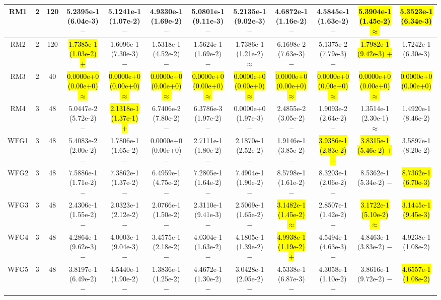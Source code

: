 \documentclass[journal]{IEEEtran}
\begin{document}
\begin{table*}[htbp]
\begin{tabular}{cccccccccccc}
\hline
\multirow{1}{*}{RM1}&2&120&5.2395e-1 (6.04e-3) $-$&5.1241e-1 (1.07e-2) $-$&4.9330e-1 (1.69e-2) $-$&5.0801e-1 (9.11e-3) $-$&5.2135e-1 (9.02e-3) $-$&4.6872e-1 (1.16e-2) $-$&4.5845e-1 (1.63e-2) $-$&\hl{5.3904e-1 (1.45e-2) $\approx$}&\hl{5.3523e-1 (6.34e-3)}\\
\hline
\multirow{1}{*}{RM2}&2&120&\hl{1.7385e-1 (1.03e-2) $+$}&1.6096e-1 (7.30e-3) $-$&1.5318e-1 (4.52e-2) $-$&1.5624e-1 (1.69e-2) $-$&1.7386e-1 (1.21e-2) $\approx$&6.1698e-2 (7.63e-3) $-$&5.1375e-2 (7.79e-3) $-$&\hl{1.7982e-1 (9.42e-3) $+$}&1.7242e-1 (6.30e-3)\\
\hline
\multirow{1}{*}{RM3}&2&40&\hl{0.0000e+0 (0.00e+0) $\approx$}&\hl{0.0000e+0 (0.00e+0) $\approx$}&\hl{0.0000e+0 (0.00e+0) $\approx$}&\hl{0.0000e+0 (0.00e+0) $\approx$}&\hl{0.0000e+0 (0.00e+0) $\approx$}&\hl{0.0000e+0 (0.00e+0) $\approx$}&\hl{0.0000e+0 (0.00e+0) $\approx$}&\hl{0.0000e+0 (0.00e+0) $\approx$}&\hl{0.0000e+0 (0.00e+0)}\\
\hline
\multirow{1}{*}{RM4}&3&48&5.0447e-2 (5.72e-2) $-$&\hl{2.1318e-1 (1.37e-1) $+$}&6.7406e-2 (7.80e-2) $-$&6.3786e-3 (1.97e-2) $-$&0.0000e+0 (1.97e-3) $-$&2.4855e-2 (3.05e-2) $-$&1.9093e-2 (2.64e-2) $-$&1.3514e-1 (2.30e-1) $\approx$&1.4920e-1 (8.46e-2)\\
\hline
\multirow{1}{*}{WFG1}&3&48&5.4083e-2 (2.00e-2) $-$&1.7806e-1 (1.65e-2) $-$&0.0000e+0 (0.00e+0) $-$&2.7111e-1 (1.80e-2) $-$&2.1870e-1 (2.52e-2) $-$&1.9146e-1 (3.85e-2) $-$&\hl{3.9386e-1 (2.83e-2) $+$}&\hl{3.8315e-1 (5.46e-2) $+$}&3.5897e-1 (8.20e-2)\\
\hline
\multirow{1}{*}{WFG2}&3&48&7.5886e-1 (1.71e-2) $-$&7.3862e-1 (1.37e-2) $-$&6.4959e-1 (4.75e-2) $-$&7.2805e-1 (1.64e-2) $-$&7.4904e-1 (1.90e-2) $-$&8.5798e-1 (1.61e-2) $-$&8.3203e-1 (2.06e-2) $-$&8.5362e-1 (5.34e-2) $-$&\hl{8.7362e-1 (6.70e-3)}\\
\hline
\multirow{1}{*}{WFG3}&3&48&2.4306e-1 (1.55e-2) $-$&2.0323e-1 (2.12e-2) $-$&2.0766e-1 (1.50e-2) $-$&2.3110e-1 (9.41e-3) $-$&2.5069e-1 (1.65e-2) $-$&\hl{3.1482e-1 (1.45e-2) $\approx$}&2.8507e-1 (1.42e-2) $-$&\hl{3.1722e-1 (5.10e-2) $\approx$}&\hl{3.1445e-1 (9.45e-3)}\\
\hline
\multirow{1}{*}{WFG4}&3&48&4.2864e-1 (9.62e-3) $-$&4.0003e-1 (9.04e-3) $-$&3.4575e-1 (2.18e-2) $-$&4.0304e-1 (1.63e-2) $-$&4.1805e-1 (1.39e-2) $-$&\hl{4.9938e-1 (1.19e-2) $+$}&4.5494e-1 (4.63e-3) $-$&4.8463e-1 (3.83e-2) $-$&4.9238e-1 (1.08e-2)\\
\hline
\multirow{1}{*}{WFG5}&3&48&3.8197e-1 (6.49e-2) $-$&4.5440e-1 (1.90e-2) $-$&1.3836e-1 (1.25e-2) $-$&4.4672e-1 (1.30e-2) $-$&3.0428e-1 (2.05e-2) $-$&4.5338e-1 (6.87e-3) $-$&4.3058e-1 (1.10e-2) $-$&3.8616e-1 (9.72e-2) $-$&\hl{4.6557e-1 (1.08e-2)}\\

\end{tabular}
\end{table*}
\end{document}
